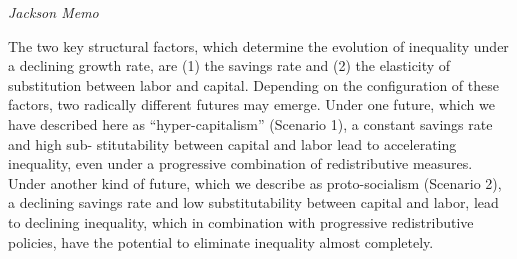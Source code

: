 \documentclass[
]{book}
\begin{document}
\emph{Jackson Memo}

The two key structural factors, which determine the evolution of
inequality under a declining growth rate, are (1) the savings rate and
(2) the elasticity of substitution between labor and capital. Depending
on the configuration of these factors, two radically different futures
may emerge. Under one future, which we have described here as
``hyper-capitalism'' (Scenario 1), a constant savings rate and high sub-
stitutability between capital and labor lead to accelerating inequality,
even under a progressive combination of redistributive measures.
Under another kind of future, which we describe as proto-socialism
(Scenario 2), a declining savings rate and low substitutability between
capital and labor, lead to declining inequality, which in combination
with progressive redistributive policies, have the potential to eliminate
inequality almost completely.
\end{document}
